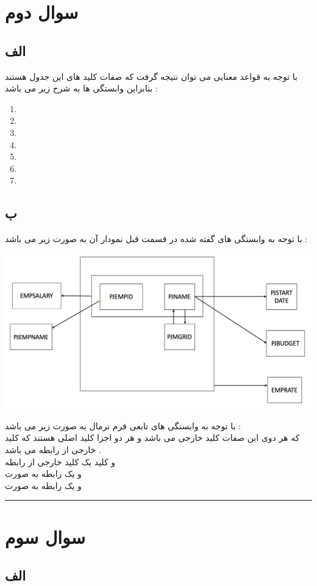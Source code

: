 \documentclass{article}
\begin{document}
\section*{سوال دوم }
\subsection*{الف}
با توجه به قواعد معنایی می توان نتیجه گرفت که صفات 
کلید های این جدول هستند بنابراین وابستگی ها به شرح زیر می باشد  : 
\begin{flushleft}
	\begin{enumerate}
		\item 
		\item
		\item 
		\item 
		\item 
		\item 
		\item 
	\end{enumerate}
\end{flushleft}
\subsection*{ب}
با توجه به وابستگی های گفته شده در قسمت قبل نمودار 
آن به صورت زیر می باشد  : 
\begin{center}
		\includegraphics[width=.5\linewidth]{q2p1} 
\end{center}
با توجه به وابستگی های تابعی فرم نرمال 
به صورت زیر می باشد   : 
\\
که هر دوی این صفات کلید خارجی می باشد و هر دو اجزا کلید اصلی هستند که 
کلید خارجی از رابطه 
می باشد  . 
\\
و کلید 
یک کلید خارجی 
از رابطه 
\\
و یک رابطه به صورت 
\\
و یک رابطه به صورت 
\\
\hrule
\section*{سوال سوم }
\subsection*{الف}
\end{document}
